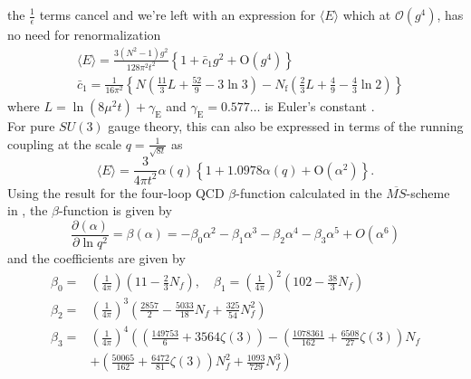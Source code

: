 \documentclass[a4paper,10pt]{book}
\begin{document}
the $\frac{1}{\epsilon}$ terms cancel and we're left with an expression for $\langle  E \rangle$ which at $\mathcal{O}(g^4)$, has no need for renormalization
\begin{equation}
\begin{aligned}
&\langle E\rangle=\frac{3\left(N^{2}-1\right) g^{2}}{128 \pi^{2} t^{2}}\left\{1+\bar{c}_{1} g^{2}+\mathrm{O}\left(g^{4}\right)\right\} \\
&\bar{c}_{1}=\frac{1}{16 \pi^{2}}\left\{N\left(\frac{11}{3} L+\frac{52}{9}-3 \ln 3\right)-N_{\mathrm{f}}\left(\frac{2}{3} L+\frac{4}{9}-\frac{4}{3} \ln 2\right)\right\}
\end{aligned}
\end{equation}
where $L=\ln \left(8 \mu^{2} t\right)+\gamma_{\mathrm{E}}$ and $\gamma_{\mathrm{E}}=0.577\ldots$ is Euler's constant  \cite{Luscher2010}.\\For pure $SU(3)$ gauge theory, this can also be expressed in terms of the running coupling at the scale $q=\frac{1}{\sqrt{8t}}$ as
\begin{equation}\label{eq:leadingOrder_pt_E}
\langle E\rangle=\frac{3}{4 \pi t^{2}} \alpha(q)\left\{1+1.0978\alpha(q)+\mathrm{O}\left(\alpha^{2}\right)\right\}.
\end{equation}
Using the result for the four-loop QCD $\beta$-function calculated in the $\overline{MS}$-scheme in \cite{vanRitbergenT1997}, the $\beta$-function is given by
\begin{equation}
\frac{\partial \left( \alpha\right)}{\partial \ln q^{2}}=\beta\left(\alpha\right)=-\beta_{0} \alpha^{2}-\beta_{1} \alpha^{3}-\beta_{2} \alpha^{4}-\beta_{3} \alpha^{5}+O\left(\alpha^{6}\right)
\end{equation}
and the coefficients are given by
\begin{equation}
\begin{aligned}
\beta_{0}=&\left( \frac{1}{4\pi} \right)\left( 11-\frac{2}{3} N_{f} \right), \quad \beta_{1}=\left( \frac{1}{4\pi} \right)^2\left( 102-\frac{38}{3} N_{f} \right)\\ \beta_{2}=&\left( \frac{1}{4\pi} \right)^3\left( \frac{2857}{2}-\frac{5033}{18} N_{f}+\frac{325}{54} N_{f}^{2} \right)\\ \beta_{3}=&\left( \frac{1}{4\pi} \right)^4\left(\left(\frac{149753}{6}+3564 \zeta(3)\right)-\left(\frac{1078361}{162}+\frac{6508}{27} \zeta(3)\right) N_{f}\right.\\&\left.+\left(\frac{50065}{162}+\frac{6472}{81} \zeta(3)\right) N_{f}^{2}+\frac{1093}{729} N_{f}^{3}\right)
\end{aligned}
\end{equation}
\end{document}
